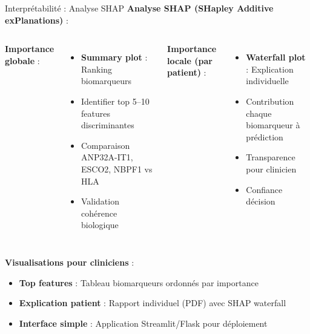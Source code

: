 \documentclass[11pt, aspectratio=169]{beamer}
\begin{document}
\begin{frame}{Interprétabilité : Analyse SHAP}
  \textbf{\color{accent2} Analyse SHAP (SHapley Additive exPlanations)} :
  
  \vspace{0.6em}
  
  \begin{columns}[T]
    \textbf{Importance globale} :
    \begin{itemize}
      \item \textbf{Summary plot} : Ranking biomarqueurs
      \item Identifier top 5--10 features discriminantes
      \item Comparaison ANP32A-IT1, ESCO2, NBPF1 vs HLA
      \item Validation cohérence biologique
    \end{itemize}
    
    \textbf{Importance locale (par patient)} :
    \begin{itemize}
      \item \textbf{Waterfall plot} : Explication individuelle
      \item Contribution chaque biomarqueur à prédiction
      \item Transparence pour clinicien
      \item Confiance décision
    \end{itemize}
  \end{columns}
  
  \vspace{1em}
  
  \textbf{\color{accent2} Visualisations pour cliniciens} :
  \begin{itemize}
    \item \textbf{Top features} : Tableau biomarqueurs ordonnés par importance
    \item \textbf{Explication patient} : Rapport individuel (PDF) avec SHAP waterfall
    \item \textbf{Interface simple} : Application Streamlit/Flask pour déploiement
  \end{itemize}
\end{frame}
\end{document}
